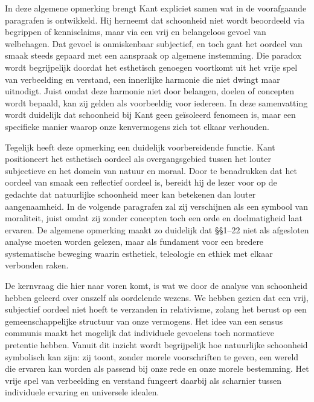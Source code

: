 \begin{mdframed}[leftmargin=0pt,rightmargin=0pt,backgroundcolor=blue!6,linecolor=white,innertopmargin=6pt,innerbottommargin=6pt]
\bigskip
In deze algemene opmerking brengt Kant expliciet samen wat in de voorafgaande paragrafen is ontwikkeld. Hij herneemt dat schoonheid niet wordt beoordeeld via begrippen of kennisclaims, maar via een vrij en belangeloos gevoel van welbehagen. Dat gevoel is onmiskenbaar subjectief, en toch gaat het oordeel van smaak steeds gepaard met een aanspraak op algemene instemming. Die paradox wordt begrijpelijk doordat het esthetisch genoegen voortkomt uit het vrije spel van verbeelding en verstand, een innerlijke harmonie die niet dwingt maar uitnodigt. Juist omdat deze harmonie niet door belangen, doelen of concepten wordt bepaald, kan zij gelden als voorbeeldig voor iedereen. In deze samenvatting wordt duidelijk dat schoonheid bij Kant geen geïsoleerd fenomeen is, maar een specifieke manier waarop onze kenvermogens zich tot elkaar verhouden.

Tegelijk heeft deze opmerking een duidelijk voorbereidende functie. Kant positioneert het esthetisch oordeel als overgangsgebied tussen het louter subjectieve en het domein van natuur en moraal. Door te benadrukken dat het oordeel van smaak een reflectief oordeel is, bereidt hij de lezer voor op de gedachte dat natuurlijke schoonheid meer kan betekenen dan louter aangenaamheid. In de volgende paragrafen zal zij verschijnen als een symbool van moraliteit, juist omdat zij zonder concepten toch een orde en doelmatigheid laat ervaren. De algemene opmerking maakt zo duidelijk dat §§1–22 niet als afgesloten analyse moeten worden gelezen, maar als fundament voor een bredere systematische beweging waarin esthetiek, teleologie en ethiek met elkaar verbonden raken.

De kernvraag die hier naar voren komt, is wat we door de analyse van schoonheid hebben geleerd over onszelf als oordelende wezens. We hebben gezien dat een vrij, subjectief oordeel niet hoeft te verzanden in relativisme, zolang het berust op een gemeenschappelijke structuur van onze vermogens. Het idee van een sensus communis maakt het mogelijk dat individuele gevoelens toch normatieve pretentie hebben. Vanuit dit inzicht wordt begrijpelijk hoe natuurlijke schoonheid symbolisch kan zijn: zij toont, zonder morele voorschriften te geven, een wereld die ervaren kan worden als passend bij onze rede en onze morele bestemming. Het vrije spel van verbeelding en verstand fungeert daarbij als scharnier tussen individuele ervaring en universele idealen.


\end{mdframed}
